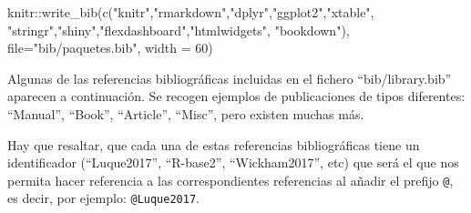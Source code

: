 \documentclass[12pt,a4paper,oneside,]{book}
\newenvironment{Shaded}{\begin{snugshade}}{\end{snugshade}}
\newcommand{\AttributeTok}[1]{\textcolor[rgb]{0.77,0.63,0.00}{#1}}
\newcommand{\DecValTok}[1]{\textcolor[rgb]{0.00,0.00,0.81}{#1}}
\newcommand{\FunctionTok}[1]{\textcolor[rgb]{0.00,0.00,0.00}{#1}}
\newcommand{\NormalTok}[1]{#1}
\newcommand{\SpecialCharTok}[1]{\textcolor[rgb]{0.00,0.00,0.00}{#1}}
\newcommand{\StringTok}[1]{\textcolor[rgb]{0.31,0.60,0.02}{#1}}
\numberwithin{dummy}{section}
\theoremstyle{ocrenumbox}
\theoremstyle{blacknumex}
\theoremstyle{blacknumbox}
\theoremstyle{ocrenum}
\theoremstyle{ocrenum}
\begin{document}
\bigskip

\begin{Shaded}
\begin{Highlighting}[]
\NormalTok{knitr}\SpecialCharTok{::}\FunctionTok{write\_bib}\NormalTok{(}\FunctionTok{c}\NormalTok{(}\StringTok{"knitr"}\NormalTok{,}\StringTok{"rmarkdown"}\NormalTok{,}\StringTok{"dplyr"}\NormalTok{,}\StringTok{"ggplot2"}\NormalTok{,}\StringTok{"xtable"}\NormalTok{,}
                   \StringTok{"stringr"}\NormalTok{,}\StringTok{"shiny"}\NormalTok{,}\StringTok{"flexdashboard"}\NormalTok{,}\StringTok{"htmlwidgets"}\NormalTok{,}
                   \StringTok{"bookdown"}\NormalTok{),}
                 \AttributeTok{file=}\StringTok{"bib/paquetes.bib"}\NormalTok{, }
                 \AttributeTok{width =} \DecValTok{60}\NormalTok{)}
\end{Highlighting}
\end{Shaded}

Algunas de las referencias bibliográficas incluidas en el fichero
``bib/library.bib'' aparecen a continuación. Se recogen ejemplos de
publicaciones de tipos diferentes: ``Manual'', ``Book'', ``Article'',
``Misc'', pero existen muchas más.

Hay que resaltar, que cada una de estas referencias bibliográficas tiene
un identificador (``Luque2017'', ``R-base2'', ``Wickham2017'', etc) que
será el que nos permita hacer referencia a las correspondientes
referencias al añadir el prefijo \texttt{@}, es decir, por ejemplo:
\texttt{@Luque2017}.
\end{document}
